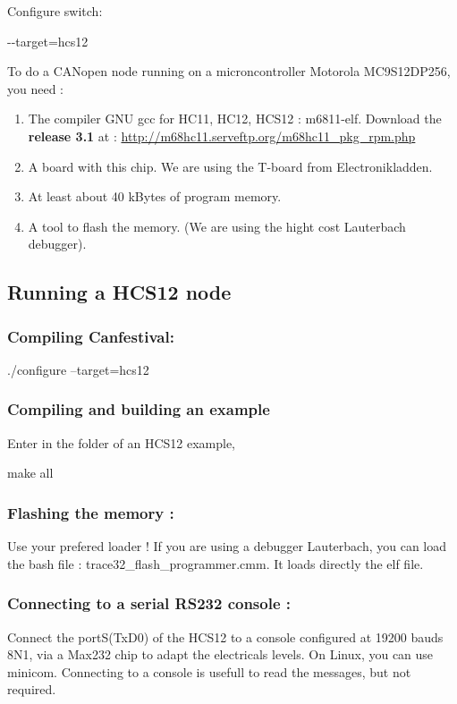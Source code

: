 \documentclass[a4paper,12pt]{book}
\newcommand\liststyleLx{%
\renewcommand\labelitemi{{--}}
\renewcommand\labelitemii{{--}}
\renewcommand\labelitemiii{{--}}
\renewcommand\labelitemiv{{--}}
}
\begin{document}
Configure switch:

{\ttfamily
 {}-{}-target=hcs12}

To do a CANopen node running on a microncontroller Motorola MC9S12DP256,
you need :

\liststyleLx
\begin{enumerate}
\item The compiler GNU gcc for HC11, HC12, HCS12 : m6811{}-elf. \newline
Download the \textbf{release 3.1} at :
\space \href{http://m68hc11.serveftp.org/m68hc11_pkg_rpm.php}{http://m68hc11.serveftp.org/m68hc11\_pkg\_rpm.php}

\item A board with this chip. We are using the T{}-board from
Electronikladden. 
\item At least about 40 kBytes of program memory.
\item A tool to flash the memory. (We are using the hight cost
Lauterbach debugger).
\end{enumerate}
\subsection{Running a HCS12 node}
\subsubsection{Compiling Canfestival:}
{\ttfamily
./configure {--}target=hcs12}

\subsubsection{Compiling and building an example}
Enter in the folder of an HCS12 example, 

{\ttfamily
make all}

\subsubsection{Flashing the memory :}
Use your prefered loader ! If you are using a debugger Lauterbach, you
can load the bash file : trace32\_flash\_programmer.cmm. It loads
directly the elf file.

\subsubsection{Connecting to a serial RS232 console :}
Connect the portS(TxD0) of the HCS12 to a console configured at 19200
bauds 8N1, via a Max232 chip to adapt the electricals levels. On Linux,
you can use minicom. Connecting to a console is usefull to read the
messages, but not required.
\end{document}
